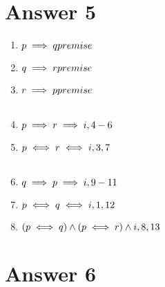 \documentclass[12pt]{article}
\begin{document}
\section*{Answer 5}
\begin{table}[H]
\begin{enumerate}
\item $ p \implies q \hfill premise$
\item $ q \implies r          \hfill    premise$
\item $ r \implies p      \hfill    premise$\\
\begin{tabular}{|p{10cm}|}
\hline
\item $ p                    \hfill    assumed$
\item $ q              \hfill        \implies e,1,4$
\item $ r                \hfill       \implies e,2,5$\\
\hline
\end{tabular}
\item $ p \implies r              \hfill     \implies i,4-6$
\item $ p \iff r        \hfill   \iff i,3,7$\\
\begin{tabular}{|p{10cm}|}
\hline
\item $ q       \hfill          assumed$
\item $ r          \hfill      \implies e,2,9$
\item $ p       \hfill  \implies e,3,10$\\
\hline
\end{tabular}
\item $ q \implies p        \hfill   \implies i,9-11$
\item $ p \iff q                 \hfill     \iff i,1,12$
\item $ (p \iff q) \land (p \iff r)          \hfill     \land i,8,13$
\end{enumerate}
\end{table}
\section*{Answer 6}
\end{document}
